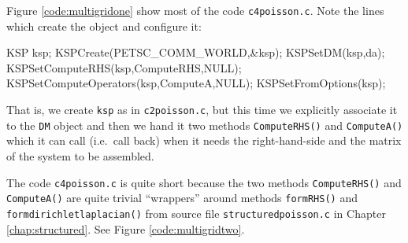 Figure \ref{code:multigridone} show most of the code \texttt{c4poisson.c}.  Note the lines which create the \pKSP object and configure it:
\begin{code}
  KSP ksp;
  KSPCreate(PETSC_COMM_WORLD,&ksp);
  KSPSetDM(ksp,da);
  KSPSetComputeRHS(ksp,ComputeRHS,NULL);
  KSPSetComputeOperators(ksp,ComputeA,NULL);
  KSPSetFromOptions(ksp);
\end{code}
That is, we create \texttt{ksp} as in \texttt{c2poisson.c}, but this time we explicitly associate it to the \texttt{DM} object and then we hand it two methods \texttt{ComputeRHS()} and \texttt{ComputeA()} which it can call (i.e.~call back) when it needs the right-hand-side and the matrix of the system to be assembled.


The code \texttt{c4poisson.c} is quite short because the two methods \texttt{ComputeRHS()} and \texttt{ComputeA()} are quite trivial ``wrappers'' around methods \texttt{formRHS()} and \texttt{formdirichletlaplacian()} from source file \texttt{structuredpoisson.c} in Chapter \ref{chap:structured}.  See Figure \ref{code:multigridtwo}.


